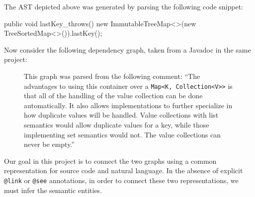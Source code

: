 \documentclass{article}
\begin{document}
\vspace{20pt}

\begin{figure}[H]
    \centering
    
    \label{fig:ast}
\end{figure}

\vspace{-30pt}The AST depicted above was generated by parsing the following code snippet:

\begin{javalisting}
public void lastKey_throws() {
    new ImmutableTreeMap<>(new TreeSortedMap<>()).lastKey();
}
\end{javalisting}

Now consider the following dependency graph, taken from a Javadoc in the same project:

\begin{figure}[H]
    \centering
    
    \caption{This graph was parsed from the following comment:
        ``The advantages to using this container over a \footnotesize\texttt{Map<K, Collection<V>{}>} is
        that all of the handling of the value collection can be done automatically.
        It also allows implementations to further specialize in how duplicate values
        will be handled. Value collections with list semantics would allow
        duplicate values for a key, while those implementing set semantics would not.
        The value collections can never be empty.''
    }
    \label{fig:eng}
\end{figure}

Our goal in this project is to connect the two graphs using a common representation for source code and natural language. In the absence of explicit \texttt{@link} or \texttt{@see} annotations, in order to connect these two representations, we must infer the semantic entities.

\clearpage
\newpage



\end{document}
